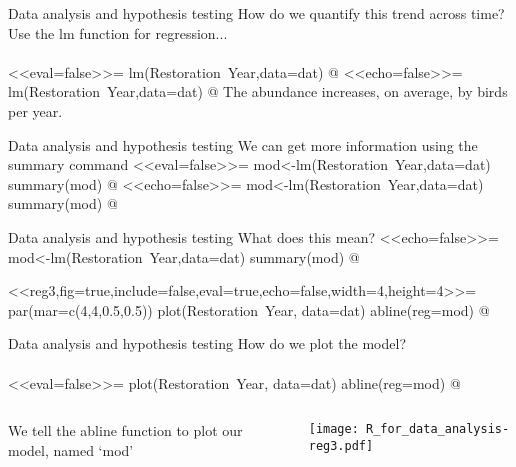 \documentclass[xcolor=svgnames]{beamer}
\begin{document}
\begin{frame}[fragile]{Data analysis and hypothesis testing}
How do we quantify this trend across time? Use the lm function for regression...\\~\\
<<eval=false>>=
lm(Restoration~Year,data=dat)
@
\pause
<<echo=false>>=
lm(Restoration~Year,data=dat)
@
\vspace{0.2in}
\pause
The abundance increases, on average, by  birds per year.
\end{frame}

\begin{frame}[fragile]{Data analysis and hypothesis testing}
We can get more information using the summary command 
\vspace{0.1in}
<<eval=false>>=
mod<-lm(Restoration~Year,data=dat)
summary(mod)
@
\pause
\scriptsize
<<echo=false>>=
mod<-lm(Restoration~Year,data=dat)
summary(mod)
@
\end{frame}

\begin{frame}[fragile]{Data analysis and hypothesis testing}
What does this mean?
\vspace{0.1in}
\scriptsize
<<echo=false>>=
mod<-lm(Restoration~Year,data=dat)
summary(mod)
@
\end{frame}

<<reg3,fig=true,include=false,eval=true,echo=false,width=4,height=4>>=
par(mar=c(4,4,0.5,0.5))
plot(Restoration~Year, data=dat)
abline(reg=mod)
@

\begin{frame}[fragile]{Data analysis and hypothesis testing}
How do we plot the model?\\~\\
<<eval=false>>=
plot(Restoration~Year, data=dat)
abline(reg=mod)
@
\vspace{-0.3in}
\begin{columns}
\begin{column}{0.5\textwidth}
We tell the abline function to plot our model, named `mod'
\end{column}
\begin{column}{0.5\textwidth}
\pause
\begin{center}
\texttt{[image: R\_for\_data\_analysis-reg3.pdf]}
\end{center}
\end{column}
\end{columns}
\end{frame}
\end{document}
